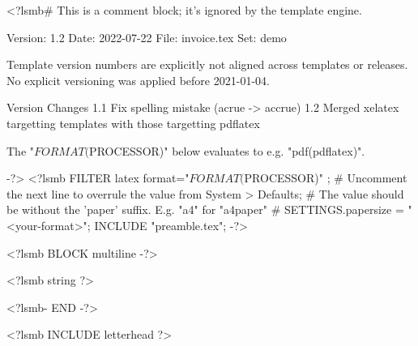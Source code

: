 <?lsmb#   This is a comment block; it's ignored by the template engine.

   Version:  1.2
   Date:     2022-07-22
   File:     invoice.tex
   Set:      demo

Template version numbers are explicitly not aligned across templates or
releases. No explicit versioning was applied before 2021-01-04.

Version   Changes
1.1       Fix spelling mistake (acrue -> accrue)
1.2       Merged xelatex targetting templates with those targetting pdflatex



The "$FORMAT($PROCESSOR)" below evaluates to e.g. "pdf(pdflatex)".

-?>
<?lsmb FILTER latex { format="$FORMAT($PROCESSOR)" };
       # Uncomment the next line to overrule the value from System > Defaults;
       # The value should be without the 'paper' suffix. E.g. "a4" for "a4paper"
       # SETTINGS.papersize = "<your-format>";
       INCLUDE "preamble.tex"; -?>

\setlength\LTleft{0pt}
\setlength\LTright{0pt}



\pagestyle{myheadings}
\thispagestyle{empty}

\ifpdftex
  \fontsize{10pt}{12pt}\selectfont
\fi

<?lsmb BLOCK multiline -?>
\begin{minipage}{2in}
\medskip
\raggedright
<?lsmb string ?>
\end{minipage}
<?lsmb- END -?>

\newsavebox{\ftr}

<?lsmb INCLUDE letterhead ?>


\vspace*{0.5cm}

